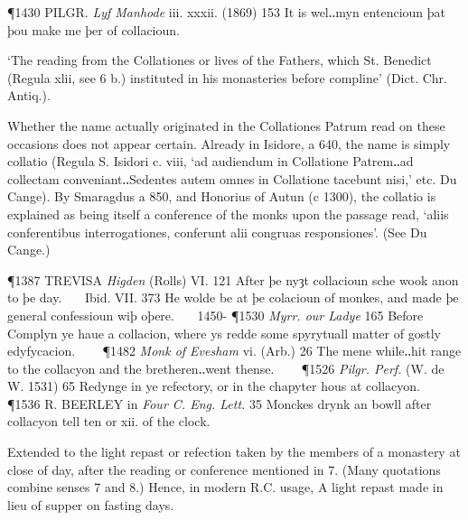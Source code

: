 \begin{description}[wide, labelwidth=!, labelindent=0pt]
\begin{myenumerate}

\P 1430 PILGR.  \textit{Lyf Manhode} iii. xxxii. (1869) 153 It is wel‥myn entencioun þat þou make me þer of collacioun.

 ‘The reading from the Collationes or lives of the Fathers, which St. Benedict (Regula xlii, see 6 b.) instituted in his monasteries before compline’ (Dict. Chr. Antiq.).

Whether the name actually originated in the Collationes Patrum read on these occasions does not appear certain. Already in Isidore, a 640, the name is simply collatio (Regula S. Isidori c. viii, ‘ad audiendum in Collatione Patrem‥ad collectam conveniant‥Sedentes autem omnes in Collatione tacebunt nisi,’ etc. Du Cange). By Smaragdus a 850, and Honorius of Autun (c 1300), the collatio is explained as being itself a conference of the monks upon the passage read, ‘aliis conferentibus interrogationes, conferunt alii congruas responsiones’. (See Du Cange.)

\P 1387 TREVISA  \textit{Higden} (Rolls) VI. 121 After þe nyȝt collacioun sche wook anon to þe day.    Ibid. VII. 373 He wolde be at þe colacioun of monkes, and made þe general confessioun wiþ oþere.    1450-
\P 1530 \textit{Myrr.  our Ladye} 165 Before Complyn ye haue a collacion, where ys redde some spyrytuall matter of gostly edyfycacion.    
\P 1482 \textit{Monk  of Evesham} vi. (Arb.) 26 The mene while‥hit range to the collacyon and the bretheren‥went thense.    
\P 1526 \textit{Pilgr.  Perf.} (W. de W. 1531) 65 Redynge in ye refectory, or in the chapyter hous at collacyon.    
\P 1536 R. BEERLEY in \textit{Four C. Eng. Lett.} 35 Monckes drynk an bowll after collacyon tell ten or xii. of the clock.

 Extended to the light repast or refection taken by the members of a monastery at close of day, after the reading or conference mentioned in 7. (Many quotations combine senses 7 and 8.) Hence, in modern R.C. usage, A light repast made in lieu of supper on fasting days.


\end{myenumerate}
\end{description}
